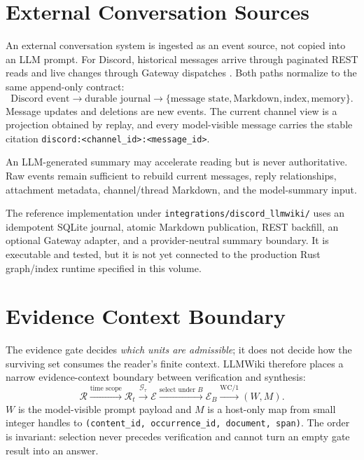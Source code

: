 \section{External Conversation Sources}
\label{sec:architecture:conversation-sources}

An external conversation system is ingested as an event source, not copied into
an LLM prompt. For Discord, historical messages arrive through paginated REST
reads and live changes through Gateway dispatches
\citep{discord2026messages,discord2026gateway}. Both paths normalize to the same
append-only contract:
\[
\text{Discord event}
\rightarrow
\text{durable journal}
\rightarrow
\{\text{message state},\text{Markdown},\text{index},\text{memory}\}.
\]
Message updates and deletions are new events. The current channel view is a
projection obtained by replay, and every model-visible message carries the
stable citation \texttt{discord:<channel\_id>:<message\_id>}.

\begin{designprinciple}
An LLM-generated summary may accelerate reading but is never authoritative.
Raw events remain sufficient to rebuild current messages, reply relationships,
attachment metadata, channel/thread Markdown, and the model-summary input.
\end{designprinciple}

The reference implementation under
\texttt{integrations/discord\_llmwiki/} uses an idempotent SQLite journal,
atomic Markdown publication, REST backfill, an optional Gateway adapter, and a
provider-neutral summary boundary. It is executable and tested, but it is not
yet connected to the production Rust graph/index runtime specified in this
volume.

\section{Evidence Context Boundary}
\label{sec:architecture:evidence-context}

The evidence gate decides \emph{which units are admissible}; it does not decide
how the surviving set consumes the reader's finite context. LLMWiki therefore
places a narrow evidence-context boundary between verification and synthesis:
\begin{equation}
\mathcal{R}
\xrightarrow{\text{time scope}}
\mathcal{R}_t
\xrightarrow{\mathcal{G}_\tau}
\mathcal{E}
\xrightarrow{\text{select under } B}
\mathcal{E}_B
\xrightarrow{\text{WC/1}}
(W,M).
\end{equation}
$W$ is the model-visible prompt payload and $M$ is a host-only map from small
integer handles to \texttt{(content\_id, occurrence\_id, document, span)}.
The order is invariant: selection never precedes verification and cannot turn
an empty gate result into an answer.

